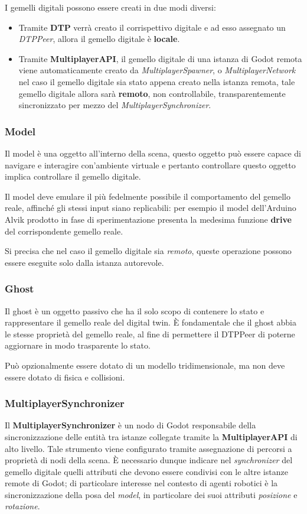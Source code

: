 I gemelli digitali possono essere creati in due modi diversi:
\begin{itemize}
	\item Tramite \textbf{DTP} verrà creato il corrispettivo digitale e ad esso assegnato un \textit{DTPPeer}, allora il gemello digitale è \textbf{locale}.
	\item Tramite \textbf{MultiplayerAPI}, il gemello digitale di una istanza di Godot remota viene automaticamente creato da \textit{MultiplayerSpawner}, o \textit{MultiplayerNetwork} nel caso il gemello digitale sia stato appena creato nella istanza remota, tale gemello digitale allora sarà \textbf{remoto}, non controllabile, transparentemente sincronizzato per mezzo del \textit{MultiplayerSynchronizer}.
\end{itemize}
\subsubsection*{Model}
Il model è una oggetto all'interno della scena, questo oggetto può essere capace di navigare e interagire con'ambiente virtuale e pertanto controllare questo oggetto implica controllare il gemello digitale.

Il model deve emulare il più fedelmente possibile il comportamento del gemello reale, affinché gli stessi input siano replicabili: per esempio il model dell'Arduino Alvik prodotto in fase di sperimentazione presenta la medesima funzione \textbf{drive} del corrispondente gemello reale.

Si precisa che nel caso il gemello digitale sia \textit{remoto}, queste operazione possono essere eseguite solo dalla istanza autorevole.
\subsubsection*{Ghost}
Il ghost è un oggetto passivo che ha il solo scopo di contenere lo stato e rappresentare il gemello reale del digital twin. È fondamentale che il ghost abbia le stesse proprietà del gemello reale, al fine di permettere il DTPPeer di poterne aggiornare in modo trasparente lo stato.

Può opzionalmente essere dotato di un modello tridimensionale, ma non deve essere dotato di fisica e collisioni.
\subsubsection*{MultiplayerSynchronizer}
Il \textbf{MultiplayerSynchronizer} è un nodo di Godot responsabile della sincronizzazione delle entità tra istanze collegate tramite la \textbf{MultiplayerAPI} di alto livello. Tale strumento viene configurato tramite assegnazione di percorsi a proprietà di nodi della scena.
È necessario dunque indicare nel \textit{synchronizer} del gemello digitale quelli attributi che devono essere condivisi con le altre istanze remote di Godot; di particolare interesse nel contesto di agenti robotici è la sincronizzazione della posa del \textit{model}, in particolare dei suoi attributi \textit{posizione} e \textit{rotazione}.

